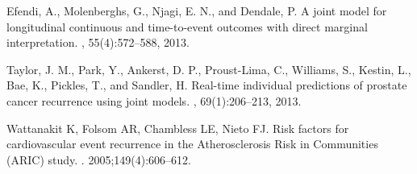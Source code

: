 \documentclass[10pt]{beamer}
\begin{document}
\begin{frame}[allowframebreaks]
\begin{thebibliography}{8}
  \beamertemplatearticlebibitems
    Efendi, A., Molenberghs, G., Njagi, E. N., and Dendale, P.
    \newblock A joint model for longitudinal continuous and time-to-event outcomes with direct marginal interpretation.
    , 55(4):572--588, 2013.

  \beamertemplatearticlebibitems
   Taylor, J. M., Park, Y., Ankerst, D. P., Proust-Lima, C., Williams, S., Kestin, L., Bae, K., Pickles, T., and Sandler, H.
    \newblock Real-time individual predictions of prostate cancer recurrence using joint models.
    , 69(1):206--213, 2013.

  \beamertemplatearticlebibitems
  Wattanakit K, Folsom AR, Chambless LE, Nieto FJ.
  \newblock Risk factors for cardiovascular event recurrence in the Atherosclerosis Risk in Communities (ARIC) study.
  . 2005;149(4):606--612.
  \end{thebibliography}
\end{frame}
\end{document}
